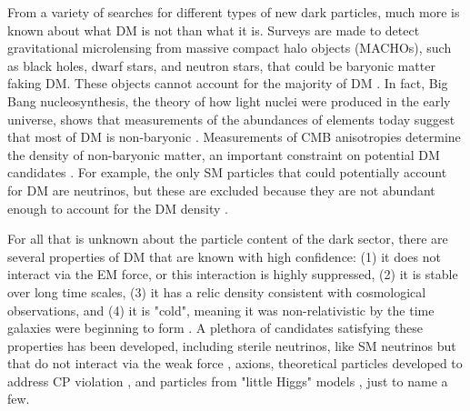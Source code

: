 From a variety of searches for different types of new dark particles, much more is known about what DM is not than what it is. Surveys are made to detect gravitational microlensing from massive compact halo objects (MACHOs), such as black holes, dwarf stars, and neutron stars, that could be baryonic matter faking DM. These objects cannot account for the majority of DM \cite{Tisserand:2006zx, Wyrzykowski:2011tr}. In fact, Big Bang nucleosynthesis, the theory of how light nuclei were produced in the early universe, shows that measurements of the abundances of elements today suggest that most of DM is non-baryonic \cite{Copi:1994ev}. Measurements of CMB anisotropies determine the density of non-baryonic matter, an important constraint on potential DM candidates \cite{Agashe:2014kda}. For example, the only SM particles that could potentially account for DM are neutrinos, but these are excluded because they are not abundant enough to account for the DM density \cite{Bertone:2004pz}. 

\indent For all that is unknown about the particle content of the dark sector, there are several properties of DM that are known with high confidence: (1) it does not interact via the EM force, or this interaction is highly suppressed, (2) it is stable over long time scales, (3) it has a relic density consistent with cosmological observations, and (4) it is "cold", meaning it was non-relativistic by the time galaxies were beginning to form \cite{Bertone:2004pz}. A plethora of candidates satisfying these properties has been developed, including sterile neutrinos, like SM neutrinos but that do not interact via the weak force \cite{Dodelson:1993je}, axions, theoretical particles developed to address CP violation \cite{Rosenberg:2000wb}, and particles from "little Higgs" models \cite{BirkedalHansen:2003mpa, Cheng:2003ju}, just to name a few. 

